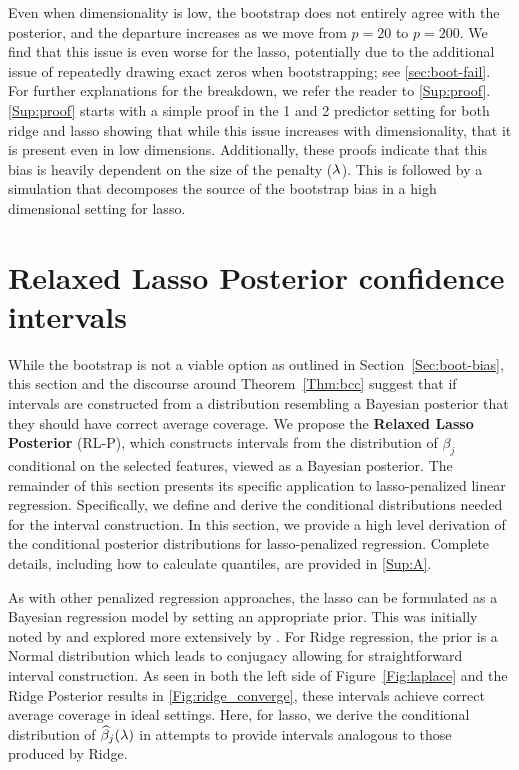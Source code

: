 Even when dimensionality is low, the bootstrap does not entirely agree with the posterior, and the departure increases as we move from $p=20$ to $p=200$. We find that this issue is even worse for the lasso, potentially due to the additional issue of repeatedly drawing exact zeros when bootstrapping; see \ref{sec:boot-fail}. For further explanations for the breakdown, we refer the reader to \ref{Sup:proof}. \ref{Sup:proof} starts with a simple proof in the 1 and 2 predictor setting for both ridge and lasso showing that while this issue increases with dimensionality, that it is present even in low dimensions. Additionally, these proofs indicate that this bias is heavily dependent on the size of the penalty ($\lambda$). This is followed by a simulation that decomposes the source of the bootstrap bias in a high dimensional setting for lasso.

\section{Relaxed Lasso Posterior confidence intervals}\label{Sec:methods}

While the bootstrap is not a viable option as outlined in Section~\ref{Sec:boot-bias}, this section and the discourse around Theorem~\ref{Thm:bcc} suggest that if intervals are constructed from a distribution resembling a Bayesian posterior that they should have correct average coverage. We propose the \textbf{Relaxed Lasso Posterior} (RL-P), which constructs intervals from the distribution of $\beta_j$ conditional on the selected features, viewed as a Bayesian posterior. The remainder of this section presents its specific application to lasso-penalized linear regression. Specifically, we define and derive the conditional distributions needed for the interval construction. In this section, we provide a high level derivation of the conditional posterior distributions for lasso-penalized regression. Complete details, including how to calculate quantiles, are provided in \ref{Sup:A}.

As with other penalized regression approaches, the lasso can be formulated as a Bayesian regression model by setting an appropriate prior. This was initially noted by \cite{Tibshirani1996} and explored more extensively by \cite{Park2008}.  For Ridge regression, the prior is a Normal distribution which leads to conjugacy allowing for straightforward interval construction. As seen in both the left side of Figure~\ref{Fig:laplace} and the Ridge Posterior results in \ref{Fig:ridge_converge}, these intervals achieve correct average coverage in ideal settings. Here, for lasso, we derive the conditional distribution of $\widehat{\beta}_j(\lambda)$ in attempts to provide intervals analogous to those produced by Ridge.

